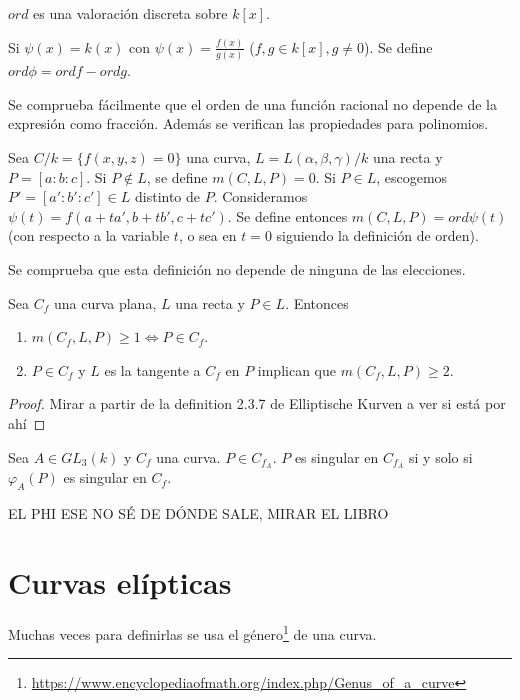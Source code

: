 \documentclass[CR.tex]{subfiles}
\begin{document}
\begin{nota}
$ord$ es una valoración discreta sobre $k[x]$. 
\end{nota}

\begin{defi}
Si $\psi(x)=k(x)$ con $\psi(x)=\frac{f(x)}{g(x)}$ ($f,g\in k[x], g\neq 0$). Se define $ord\phi=ord f-ord g$.
\end{defi}
Se comprueba fácilmente que el orden de una función racional no depende de la expresión como fracción. Además se verifican las propiedades para polinomios.

\begin{defi}
Sea $C/k=\{f(x,y,z)=0\}$ una curva, $L=L(\alpha,\beta,\gamma)/k$ una recta y $P=[a:b:c]$. Si $P\notin L$, se define $m(C,L,P)=0$. Si $P\in L$, escogemos $P'=[a':b':c']\in L$ distinto de $P$. Consideramos $\psi(t)=f(a+ta',b+tb',c+tc')$. Se define entonces $m(C,L,P)=ord\psi(t)$ (con respecto a la variable $t$, o sea en $t=0$ siguiendo la definición de orden). 
\end{defi}

Se comprueba que esta definición no depende de ninguna de las elecciones.

\begin{lemma}
Sea $C_f$ una curva plana, $L$ una recta y $P\in L$. Entonces 
\begin{enumerate}
\item $m(C_f,L,P)\geq 1\Leftrightarrow P\in C_f$. 
\item $P\in C_f$ y $L$ es la tangente a $C_f$ en $P$ implican que $m(C_f,L,P)\geq 2$.
\end{enumerate}
\end{lemma}
\begin{proof}
Mirar a partir de la definition 2.3.7 de Elliptische Kurven a ver si está por ahí
\end{proof}

\begin{lemma}
Sea $A\in GL_3(k)$ y $C_f$ una curva. $P\in C_{f_A}$. $P$ es singular en $C_{f_A}$ si y solo si $\varphi_A(P)$ es singular en $C_f$.  
\end{lemma}
EL PHI ESE NO SÉ DE DÓNDE SALE, MIRAR EL LIBRO


\section{Curvas elípticas}

Muchas veces para definirlas se usa el género\footnote{\url{https://www.encyclopediaofmath.org/index.php/Genus_of_a_curve}} de una curva. 
\end{document}
